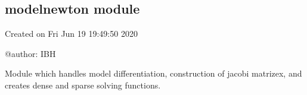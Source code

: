 \documentclass[letterpaper,10pt,english]{sphinxmanual}
\begin{document}
\sphinxstepscope


\subsection{modelnewton module}
\label{\detokenize{core/modelnewton:module-modelnewton}}\label{\detokenize{core/modelnewton:modelnewton-module}}\label{\detokenize{core/modelnewton::doc}}
\sphinxAtStartPar
Created on Fri Jun 19 19:49:50 2020

\sphinxAtStartPar
@author: IBH

\sphinxAtStartPar
Module which handles model differentiation, construction of jacobi matrizex,
and creates dense and sparse solving functions.
\end{document}
